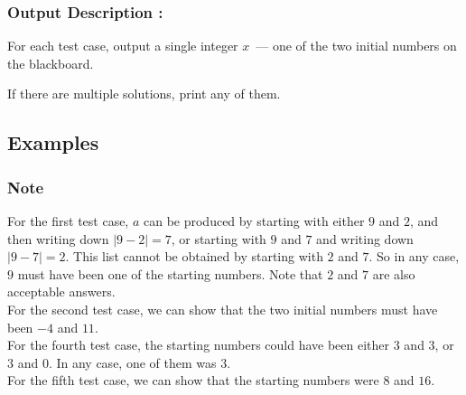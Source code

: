\documentclass{article}
\begin{document}
\subsubsection*{Output Description : }For each test case, output a single integer $x$ — one of the two initial numbers on the blackboard.

If there are multiple solutions, print any of them.
\subsection*{Examples}
\subsubsection*{Note}For the first test case, $a$ can be produced by starting with either $9$ and $2$, and then writing down $|9-2|=7$, or starting with $9$ and $7$ and writing down $|9-7|=2$. This list cannot be obtained by starting with $2$ and $7$. So in any case, $9$ must have been one of the starting numbers. Note that $2$ and $7$ are also acceptable answers.\\ For the second test case, we can show that the two initial numbers must have been $-4$ and $11$.\\ For the fourth test case, the starting numbers could have been either $3$ and $3$, or $3$ and $0$. In any case, one of them was $3$.\\ For the fifth test case, we can show that the starting numbers were $8$ and $16$.
\newpage
\end{document}
